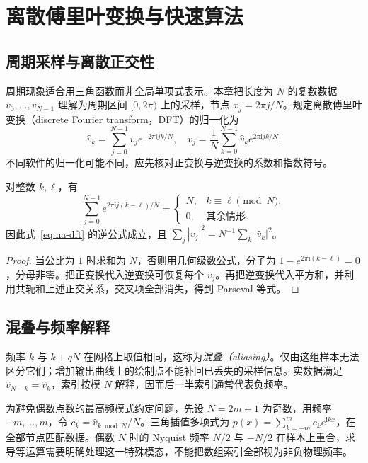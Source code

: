 \setcounter{chapter}{11} %
\chapter{离散傅里叶变换与快速算法}
\label{chap:na-fourier}

\section{周期采样与离散正交性}
周期现象适合用三角函数而非全局单项式表示。本章把长度为 $N$ 的复数数据 $v_0,\ldots,v_{N-1}$ 理解为周期区间 $[0,2\pi)$ 上的采样，节点 $x_j=2\pi j/N$。规定离散傅里叶变换（discrete Fourier transform，DFT）的归一化为
\begin{equation}
 \widehat v_k=\sum_{j=0}^{N-1}v_j e^{-2\pi\mathrm i jk/N},\quad
 v_j=\frac1N\sum_{k=0}^{N-1}\widehat v_k e^{2\pi\mathrm i jk/N}.
 \label{eq:na-dft}
\end{equation}
不同软件的归一化可能不同，应先核对正变换与逆变换的系数和指数符号。

\begin{proposition}
对整数 $k,\ell$，有
\[
 \sum_{j=0}^{N-1}e^{2\pi\mathrm i j(k-\ell)/N}
 =\begin{cases}N,&k\equiv\ell\pmod N,\\0,&\text{其余情形}.
 \end{cases}
\]
因此式~\eqref{eq:na-dft} 的逆公式成立，且 $\sum_j|v_j|^2=N^{-1}\sum_k|\widehat v_k|^2$。
\end{proposition}
\begin{proof}
当公比为 $1$ 时求和为 $N$，否则用几何级数公式，分子为 $1-e^{2\pi\mathrm i(k-\ell)}=0$，分母非零。把正变换代入逆变换可恢复每个 $v_j$。再把逆变换代入平方和，并利用共轭和上述正交关系，交叉项全部消失，得到 Parseval 等式。
\end{proof}

\section{混叠与频率解释}
频率 $k$ 与 $k+qN$ 在网格上取值相同，这称为\emph{混叠（aliasing）}。仅由这组样本无法区分它们；增加输出曲线上的绘制点不能补回已丢失的采样信息。实数据满足 $\widehat v_{N-k}=\overline{\widehat v_k}$，索引按模 $N$ 解释，因而后一半索引通常代表负频率。

为避免偶数点数的最高频模式约定问题，先设 $N=2m+1$ 为奇数，用频率 $-m,\ldots,m$，令 $c_k=\widehat v_{k\bmod N}/N$。三角插值多项式为 $p(x)=\sum_{k=-m}^{m}c_ke^{\mathrm i kx}$，在全部节点匹配数据。偶数 $N$ 时的 Nyquist 频率 $N/2$ 与 $-N/2$ 在样本上重合，求导等运算需要明确处理这一特殊模态，不能把数组索引全部视为非负物理频率。


